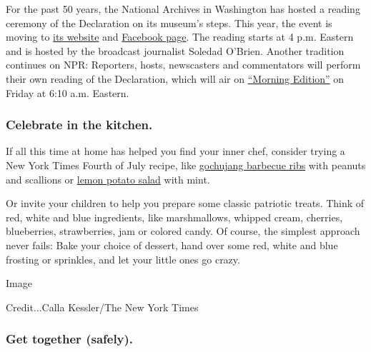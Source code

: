 For the past 50 years, the National Archives in Washington has hosted a
reading ceremony of the Declaration on its museum's steps. This year,
the event is moving to \href{http://www.archivesjuly4.org/}{its website}
and
\href{https://www.facebookcorewwwi.onion/usnationalarchives/}{Facebook
page}. The reading starts at 4 p.m. Eastern and is hosted by the
broadcast journalist Soledad O'Brien. Another tradition continues on
NPR: Reporters, hosts, newscasters and commentators will perform their
own reading of the Declaration, which will air on
\href{https://www.npr.org/}{``Morning Edition''} on Friday at 6:10 a.m.
Eastern.

\hypertarget{celebrate-in-the-kitchen}{%
\subsubsection{Celebrate in the
kitchen.}\label{celebrate-in-the-kitchen}}

If all this time at home has helped you find your inner chef, consider
trying a New York Times Fourth of July recipe, like
\href{https://cooking.nytimes3xbfgragh.onion/recipes/1018796-gochujang-barbecue-ribs-with-peanuts-and-scallions?action=click\&module=Collection\%20Page\%20Recipe\%20Card\&region=Really\%20Good\%20Recipes\%20for\%20Grilled\%20Steak\%2C\%20Ribs\%20\%26\%20Chops\&pgType=collection\&rank=7}{gochujang
barbecue ribs} with peanuts and scallions or
\href{https://cooking.nytimes3xbfgragh.onion/recipes/1017405-lemon-potato-salad-with-mint?action=click\&module=Collection\%20Band\%20Recipe\%20Card\&region=Our\%20Best\%20Picnic-Perfect\%20Potato\%20Salads\&pgType=supercollection\&rank=1}{lemon
potato salad} with mint.

Or invite your children to help you prepare some classic patriotic
treats. Think of red, white and blue ingredients, like marshmallows,
whipped cream, cherries, blueberries, strawberries, jam or colored
candy. Of course, the simplest approach never fails: Bake your choice of
dessert, hand over some red, white and blue frosting or sprinkles, and
let your little ones go crazy.

Image

Credit...Calla Kessler/The New York Times

\hypertarget{get-together-safely}{%
\subsubsection{Get together (safely).}\label{get-together-safely}}

